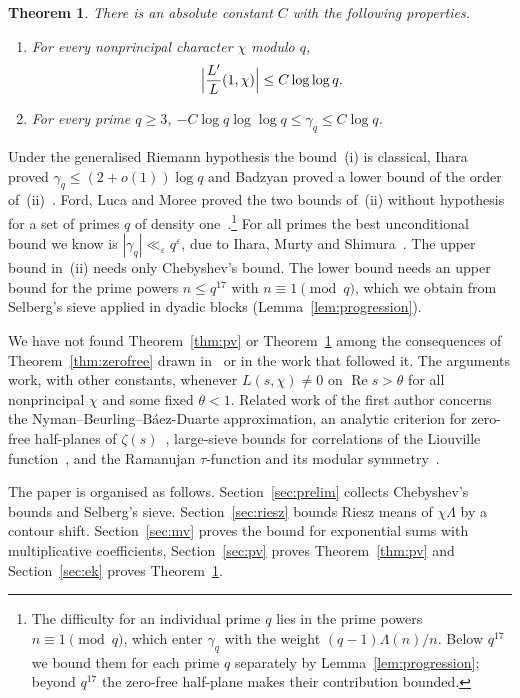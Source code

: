 \documentclass[12pt]{amsart}
\numberwithin{equation}{section}
\newtheorem{theorem}{Theorem}[section]
\theoremstyle{definition}
\renewcommand{\Re}{\operatorname{Re}}
\begin{document}
\begin{theorem}\label{thm:ek}
There is an absolute constant $C$ with the following properties.
\begin{enumerate}
\item[(i)] For every nonprincipal character $\chi$ modulo $q$,
\[
  \Bigl|\frac{L'}{L}(1,\chi)\Bigr|\le C\log\log q.
\]
\item[(ii)] For every prime $q\ge3$,
$-C\log q\log\log q\le\gamma_q\le C\log q$.
\end{enumerate}
\end{theorem}

Under the generalised Riemann hypothesis the bound~(i) is classical, Ihara proved
$\gamma_q\le(2+o(1))\log q$ and Badzyan proved a lower bound of the order
of~(ii)~\cite{Iha06,Bad10}. Ford, Luca and Moree proved the two bounds of~(ii) without hypothesis
for a set of primes $q$ of density one~\cite{FLM14,Mor18}.\footnote{The difficulty for an
individual prime $q$ lies in the prime powers $n\equiv1\pmod q$, which enter $\gamma_q$ with the
weight $(q-1)\Lambda(n)/n$. Below $q^{17}$ we bound them for each prime $q$ separately by
Lemma~\ref{lem:progression}; beyond $q^{17}$ the zero-free half-plane makes their contribution
bounded.} For all primes the best unconditional bound we know is
$|\gamma_q|\ll_\varepsilon q^\varepsilon$, due to Ihara, Murty and Shimura~\cite{IMS09}. The
upper bound in~(ii) needs only Chebyshev's bound. The lower bound needs an upper bound for the
prime powers $n\le q^{17}$ with $n\equiv1\pmod q$, which we obtain from Selberg's sieve applied
in dyadic blocks (Lemma~\ref{lem:progression}).

We have not found Theorem~\ref{thm:pv} or Theorem~\ref{thm:ek} among the consequences of
Theorem~\ref{thm:zerofree} drawn in~\cite{OAI26} or in the work that followed it. The arguments
work, with other constants, whenever $L(s,\chi)\ne0$ on $\Re s>\theta$ for all nonprincipal $\chi$
and some fixed $\theta<1$.
Related work of the first author concerns the Nyman--Beurling--B\'aez-Duarte approximation, an
analytic criterion for zero-free half-planes of $\zeta(s)$~\cite{BNFS26}, large-sieve bounds for
correlations of the Liouville function~\cite{BB26}, and the Ramanujan $\tau$-function and its
modular symmetry~\cite{BBS23}.

The paper is organised as follows. Section~\ref{sec:prelim} collects Chebyshev's bounds and
Selberg's sieve. Section~\ref{sec:riesz} bounds Riesz means of $\chi\Lambda$ by a contour shift.
Section~\ref{sec:mv} proves the bound for exponential sums with multiplicative coefficients,
Section~\ref{sec:pv} proves Theorem~\ref{thm:pv} and Section~\ref{sec:ek} proves
Theorem~\ref{thm:ek}.
\end{document}
